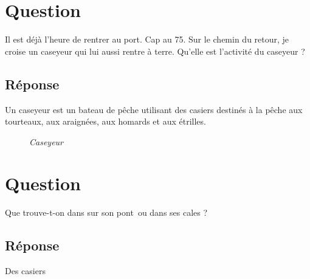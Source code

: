 \documentclass[12pt, report]{article}
\begin{document}
\section{Question}
Il est déjà l’heure de rentrer au port. Cap au 75. Sur le chemin du retour, je croise un caseyeur qui lui aussi rentre à terre. Qu’elle est l’activité du caseyeur ? 
\subsection*{Réponse}
Un caseyeur est un bateau de pêche utilisant des casiers destinés à la pêche aux tourteaux, aux araignées, aux homards et aux étrilles.
\begin{center}
\begin{figure}[ht]
\caption{\textit{Caseyeur}}
\end{figure}
\end{center}

\section{Question}
Que trouve-t-on dans  sur son pont ou dans ses cales ?
\subsection*{Réponse}
Des casiers
\begin{center}
\begin{figure}[ht]
\caption{\textit{}}
\end{figure}
\end{center}
\end{document}
